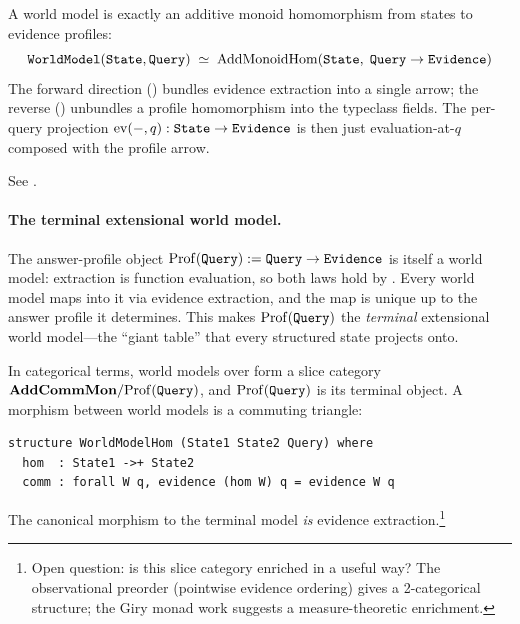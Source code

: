 \documentclass[11pt,openany]{report}
\begin{document}
\begin{theorem}
\label{thm:universal-property}
A world model is exactly an additive monoid homomorphism from states
to evidence profiles:
\[
  \texttt{WorldModel}(\texttt{State}, \texttt{Query})
  \;\simeq\;
  \mathrm{AddMonoidHom}(\texttt{State},\; \texttt{Query} \to \mathtt{Evidence})
\]
The forward direction () bundles evidence
extraction into a single arrow; the reverse
() unbundles a profile homomorphism into the
typeclass fields.  The per-query projection
$\mathrm{ev}(-,q) : \texttt{State} \to \mathtt{Evidence}$ is then just
evaluation-at-$q$ composed with the profile arrow.
\end{theorem}

\noindent
See .

\paragraph{The terminal extensional world model.}
The answer-profile object $\mathrm{Prof}(\texttt{Query}) :=
\texttt{Query} \to \mathtt{Evidence}$ is itself a world model: extraction is
function evaluation, so both laws hold by .  Every world
model maps into it via evidence extraction, and the map is unique
up to the answer profile it determines.  This makes
$\mathrm{Prof}(\texttt{Query})$ the \emph{terminal} extensional world
model---the ``giant table'' that every structured state projects
onto.

In categorical terms, world models over  form a slice
category $\mathbf{AddCommMon} / \mathrm{Prof}(\texttt{Query})$,
and $\mathrm{Prof}(\texttt{Query})$ is its terminal object.  A morphism
between world models is a commuting triangle:

\begin{lstlisting}
structure WorldModelHom (State1 State2 Query) where
  hom  : State1 ->+ State2
  comm : forall W q, evidence (hom W) q = evidence W q
\end{lstlisting}

\noindent
The canonical morphism to the terminal model \emph{is} evidence
extraction.\footnote{Open question: is this slice category enriched
in a useful way?  The observational preorder (pointwise evidence
ordering) gives a 2-categorical structure; the Giry monad work
suggests a measure-theoretic enrichment.}
\end{document}
